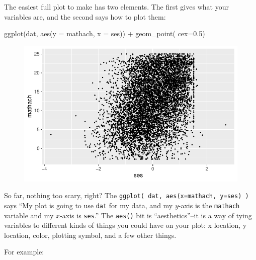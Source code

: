 \documentclass[
  letterpaper,
  DIV=11,
  numbers=noendperiod]{scrreprt}
\newenvironment{Shaded}{\begin{snugshade}}{\end{snugshade}}
\newcommand{\AttributeTok}[1]{\textcolor[rgb]{0.49,0.56,0.16}{#1}}
\newcommand{\FloatTok}[1]{\textcolor[rgb]{0.25,0.63,0.44}{#1}}
\newcommand{\FunctionTok}[1]{\textcolor[rgb]{0.02,0.16,0.49}{#1}}
\newcommand{\NormalTok}[1]{\textcolor[rgb]{0.00,0.44,0.13}{#1}}
\newcommand{\SpecialCharTok}[1]{\textcolor[rgb]{0.25,0.44,0.63}{#1}}
\begin{document}
The easiest full plot to make has two elements. The first gives what
your variables are, and the second says how to plot them:

\begin{Shaded}
\begin{Highlighting}[]
\FunctionTok{ggplot}\NormalTok{(dat, }\FunctionTok{aes}\NormalTok{(}\AttributeTok{y =}\NormalTok{ mathach, }\AttributeTok{x =}\NormalTok{ ses)) }\SpecialCharTok{+} 
  \FunctionTok{geom\_point}\NormalTok{( }\AttributeTok{cex=}\FloatTok{0.5}\NormalTok{)}
\end{Highlighting}
\end{Shaded}

\begin{figure}[H]

{\centering \includegraphics{intro_ggplot_files/figure-pdf/unnamed-chunk-2-1.pdf}

}

\end{figure}

So far, nothing too scary, right? The
\texttt{ggplot(\ dat,\ aes(x=mathach,\ y=ses)\ )} says ``My plot is
going to use \texttt{dat} for my data, and my \(y\)-axis is the
\texttt{mathach} variable and my \(x\)-axis is \texttt{ses}.'' The
\texttt{aes()} bit is ``aesthetics''--it is a way of tying variables to
different kinds of things you could have on your plot: x location, y
location, color, plotting symbol, and a few other things.

For example:
\end{document}
